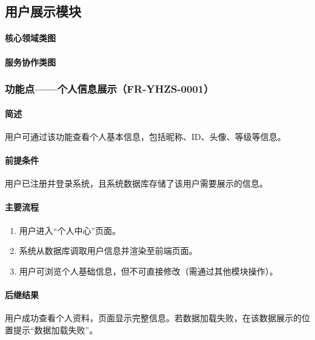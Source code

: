 \subsection{用户展示模块}

\paragraph*{核心领域类图}

\begin{center}
\resizebox{0.98\linewidth}{!}{}
\end{center}

\paragraph*{服务协作类图}

\begin{center}
\resizebox{0.98\linewidth}{!}{}
\end{center}

{\color{black}
\subsubsection{功能点——个人信息展示（FR-YHZS-0001）}

\paragraph*{简述}

用户可通过该功能查看个人基本信息，包括昵称、ID、头像、等级等信息。

\paragraph*{前提条件}

用户已注册并登录系统，且系统数据库存储了该用户需要展示的信息。

\paragraph*{主要流程}

\begin{enumerate}
    \item 用户进入“个人中心”页面。
    \item 系统从数据库调取用户信息并渲染至前端页面。
    \item 用户可浏览个人基础信息，但不可直接修改（需通过其他模块操作）。
\end{enumerate}

\paragraph*{后继结果}

用户成功查看个人资料，页面显示完整信息。若数据加载失败，在该数据展示的位置提示“数据加载失败”。
}

